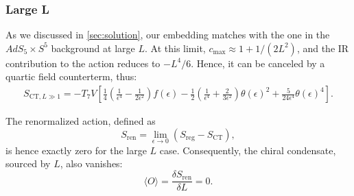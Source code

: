 \subsubsection*{Large L}
As we discussed in \ref{sec:solution}, our embedding matches with the one in the $AdS_5 \times S^5$ background at large $L$. At this limit, $c_{\max }\approx 1+ 1/(2 L^{2})$, and the IR contribution to the action reduces to $-L^4/6$. Hence, it can be canceled by a quartic field counterterm, thus:
\begin{align}\label{eq:countertermsLargeL}
 S_{\text{CT}, L\gg 1} =  -T_7 V \left[ 
  \frac{1}{4} \left(\frac{1}{\epsilon ^4}-\frac{1}{2 \epsilon ^2}\right) f(\epsilon)
   -\frac{1}{2}\left(\frac{1}{\epsilon ^4}+\frac{2}{3 \epsilon ^2}\right) \theta (\epsilon)^2 + \frac{5}{24 \epsilon^4} \theta (\epsilon)^4
   \right].
\end{align}

The renormalized action, defined as
\begin{equation}
 S_\text{ren} = \lim_{\epsilon\rightarrow 0} (S_\text{reg}-S_\text{CT}),
\end{equation}
is hence exactly zero for the large $L$ case. Consequently, the chiral condensate, sourced by $L$, also vanishes:
\begin{equation} 
\langle O \rangle = \frac{\delta S_\text{ren}}{\delta L} = 0. 
\end{equation}




 




